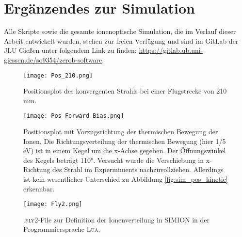 \section{Ergänzendes zur Simulation}
Alle Skripte sowie die gesamte ionenoptische Simulation, die im Verlauf dieser Arbeit entwickelt wurden, stehen zur freien Verfügung und sind im GitLab der JLU Gießen unter folgendem Link zu finden: \url{https://gitlab.ub.uni-giessen.de/so9354/zerob-software}.



\begin{figure}[H]
    \centering
    \texttt{[image: Pos\_210.png]}
    \caption[Positionsplot des konvergenten Strahls]{Positionsplot des konvergenten Strahls bei einer Flugstrecke von 210 mm.}
    \label{fig:pos_210}
\end{figure}

\begin{figure}[H]
    \centering
    \texttt{[image: Pos\_Forward\_Bias.png]}
    \caption[Positionsplot mit Vorzugsrichtung der thermischen Bewegung]{Positionsplot mit Vorzugsrichtung der thermischen Bewegung der Ionen. Die Richtungsverteilung der thermischen Bewegung (hier 1/5 eV) ist in einem Kegel um die x-Achse gegeben. Der Öffnungswinkel des Kegels beträgt 110°. Versucht wurde die Verschiebung in x-Richtung des Strahl im Expermiments nachzuvollziehen. Allerdings ist kein wesentlicher Unterschied zu Abbildung \ref{fig:sim_pos_kinetic} erkennbar.}
    \label{fig:pos_bias}
\end{figure}   


\begin{figure}[H]
    \centering
    \texttt{[image: Fly2.png]}
    \caption[Ionenverteilung .fly2-File]{\textsc{.fly2}-File zur Definition der Ionenverteilung in \textsc{SIMION} in der Programmiersprache \textsc{Lua}.}
    \label{fly2}
\end{figure}